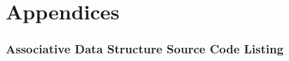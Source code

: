 \documentclass[10pt, a4paper, twosize]{article}
\begin{document}

\part{Appendices}

\appendix

\section{Associative Data Structure Source Code Listing}
\label{hash_listing}
\end{document}
